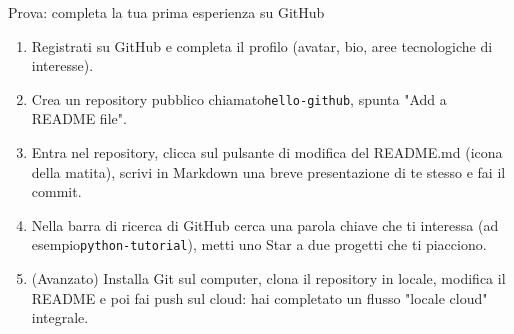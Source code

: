 \begin{tcbpractice}{Prova: completa la tua prima esperienza su GitHub}
\begin{enumerate}
  \item Registrati su GitHub e completa il profilo (avatar, bio, aree tecnologiche di interesse).
  \item Crea un repository pubblico chiamato\texttt{hello-\allowbreak github}, spunta "Add a README file".
  \item Entra nel repository, clicca sul pulsante di modifica del README.md (icona della matita), scrivi in Markdown una breve presentazione di te stesso e fai il commit.
  \item Nella barra di ricerca di GitHub cerca una parola chiave che ti interessa (ad esempio\texttt{python-\allowbreak tutorial}), metti uno Star a due progetti che ti piacciono.
  \item (Avanzato) Installa Git sul computer, clona il repository in locale, modifica il README e poi fai push sul cloud: hai completato un flusso "locale cloud" integrale.
\end{enumerate}

\end{tcbpractice}
